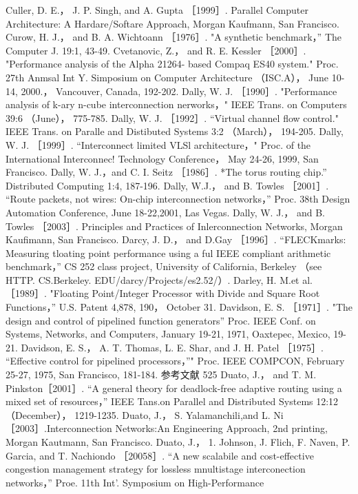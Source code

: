 Culler, D. E.， J. P. Singh, and A. Gupta ［1999］. Parallel Computer Architecture: A Hardare/Softare Approach, Morgan
Kaufmann, San Francisco.
Curow, H. J.， and B. A. Wichtoann ［1976］. "A synthetic benchmark，” The Computer J. 19:1, 43-49.
Cvetanovic, Z.， and R. E. Kessler ［2000］. "Performance analysis of the Alpha 21264- based Compaq ES40 system." Proc. 27th
Anmsal Int Y. Simposium on Computer Architecture （ISC.A）， June 10-14, 2000.， Vancouver, Canada, 192-202.
Dally, W. J. ［1990］. "Performance analysis of k-ary n-cube interconnection nerworks，" IEEE Trans. on Computers 39:6 （June），
775-785.
Dally, W. J. ［1992］. “Virtual channel flow control." IEEE Trans. on Paralle and Distibuted Systems 3:2 （March）， 194-205.
Dally, W. J. ［1999］. “Interconnect limited VLSl architecture，" Proc. of the International Interconnec! Technology Conference，
May 24-26, 1999, San Francisco.
Dally, W. J.，and C. I. Seitz ［1986］. *The torus routing chip.” Distributed Computing 1:4, 187-196.
Dally, W.J.， and B. Towles ［2001］. “Route packets, not wires: On-chip interconnection networks，” Proc. 38th Design Automation
Conference, June 18-22,2001, Las Vegas.
Dally, W. J.， and B. Towles ［2003］. Principles and Practices of Inlerconnection Networks, Morgan Kaufimann, San Francisco.
Darcy, J. D.， and D.Gay ［1996］. “FLECKmarks: Measuring tloating point performance using a ful IEEE compliant arithmetic
benchmark，” CS 252 class project, University of California, Berkeley （see HTTP. CS.Berkeley. EDU/darcy/Projects/es2.52/）.
Darley, H. M.et al. ［1989］. "Floating Point/Integer Processor with Divide and Square Root Functions，” U.S. Patent 4,878, 190，
October 31.
Davidson, E. S. ［1971］. "The design and control of pipelined function generators” Proc. IEEE Conf. on Systems, Networks, and
Computers, January 19-21, 1971, Oaxtepec, Mexico, 19-21.
Davidson, E. S.， A. T. Thomas, L. E. Shar, and J. H. Patel ［1975］. “Effective control for pipelined processors，”" Proc. IEEE
COMPCON, February 25-27, 1975, San Francisco, 181-184.
参考文献
525
Duato, J.， and T. M. Pinkston［2001］. “A general theory for deadlock-free adaptive routing using a mixed set of resources，” IEEE
Tans.on Parallel and Distributed Systems 12:12 （December）， 1219-1235.
Duato, J.， S. Yalamanchili,and L. Ni［2003］.Interconnection Networks:An Engineering Approach, 2nd printing, Morgan
Kautmann, San Francisco.
Duato, J.， 1. Johnson, J. Flich, F. Naven, P. Garcia, and T. Nachiondo ［20058］. “A new scalabile and cost-effective congestion
management strategy for lossless mnultistage interconection networks，” Proe. 11th Int'. Symposium on High-Performance
